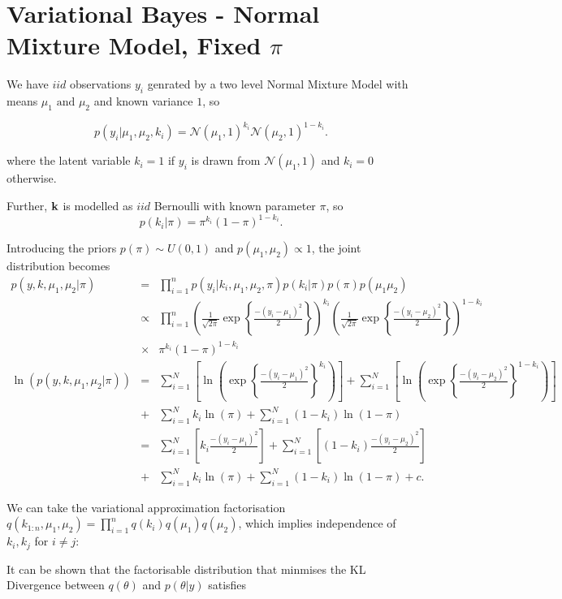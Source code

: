 \documentclass[12pt]{article}\usepackage[]{graphicx}\usepackage[]{color}
\begin{document}
\section{Variational Bayes - Normal Mixture Model, Fixed $\pi$}

We have $iid$ observations $y_i$ genrated by a two level Normal Mixture Model with means $\mu_1 \mbox{ and } \mu_2$ and known variance $1$, so

$$p(y_i | \mu_1, \mu_2, k_i) = \mathcal{N}(\mu_1, 1)^{k_i} \mathcal{N}(\mu_2, 1)^{1-k_i}.$$

where the latent variable $k_i = 1$ if $y_i$ is drawn from $\mathcal{N}(\mu_1, 1)$ and $k_i = 0$ otherwise.

Further, $\bold{k}$ is modelled as $iid$ Bernoulli with known parameter $\pi$, so
$$p(k_i | \pi) = \pi^{k_i} (1-\pi)^{1-k_i}. $$

Introducing the priors $p(\pi) \sim U(0, 1)$ and $p(\mu_1, \mu_2) \propto 1$, the joint distribution becomes
\begin{eqnarray}
\label{1}
p(y, k, \mu_1, \mu_2 | \pi) & = & \prod^{n}_{i=1} p(y_i | k_i, \mu_1, \mu_2, \pi) p(k_i | \pi) p(\pi) p(\mu_1 \mu_2) \nonumber \\
& \propto & \prod^{n}_{i=1} \left(\frac{1}{\sqrt{2\pi}} \exp \left\{\frac{-(y_i-\mu_1)^2}{2}\right\}\right)^{k_i} \left(\frac{1}{\sqrt{2\pi}} \exp \left\{\frac{-(y_i-\mu_2)^2}{2}\right\}\right)^{1-k_i} \nonumber \\
& \times & \pi^{k_i} (1-\pi)^{1-k_i} \nonumber \\
\ln(p(y, k, \mu_1, \mu_2 | \pi)) & = & \sum_{i=1}^{N} \left[ \ln\left(\exp \left\{\frac{-(y_i-\mu_1)^2}{2}\right\}^{k_i}\right)\right] + \sum_{i=1}^{N} \left[ \ln\left(\exp \left\{\frac{-(y_i-\mu_2)^2}{2}\right\}^{1-k_i}\right)\right] \nonumber \\
& + & \sum_{i=1}^{N} k_i \ln(\pi) + \sum_{i=1}^{N} (1-k_i) \ln(1-\pi) \nonumber \\
& = & \sum_{i=1}^{N} \left[ k_{i} \frac{-(y_i-\mu_1)^2}{2}\right] + \sum_{i=1}^{N} \left[ (1-k_{i}) \frac{-(y_i-\mu_2)^2}{2}\right] \nonumber \\
& + & \sum_{i=1}^{N} k_i \ln(\pi) + \sum_{i=1}^{N} (1-k_i) \ln(1-\pi) + c.
\end{eqnarray}

We can take the variational approximation factorisation $q(k_{1:n}, \mu_1, \mu_2) = \prod_{i=1}^{n} q(k_i)q(\mu_1)q(\mu_2)$, which implies independence of $k_i, k_j$ for $i \neq j$:

It can be shown that the factorisable distribution that minmises the KL Divergence between $q(\theta)$ and $p(\theta|y)$ satisfies
\end{document}
